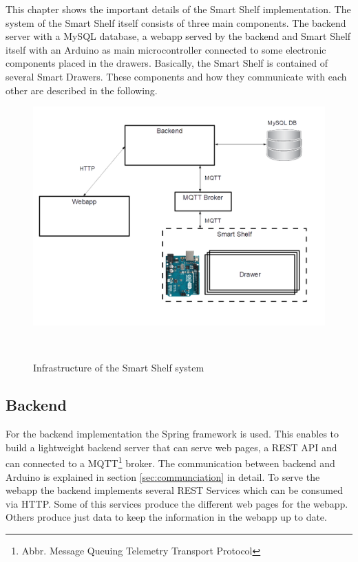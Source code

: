 This chapter shows the important details of the Smart Shelf implementation. 
The system of the Smart Shelf itself consists of three main components. 
The backend server with a MySQL database, a webapp served by the backend and Smart Shelf itself with an Arduino as main microcontroller connected to some electronic components placed in the drawers. 
Basically, the Smart Shelf is contained of several Smart Drawers. 
These components and how they communicate with each other are described in the following. 
%
\begin{figure}
	\centering
	\includegraphics[width=1.3\columnwidth]{figures/infrastructure-smartshelf-white.png}
	\caption{Infrastructure of the Smart Shelf system}~\label{fig:infrastructure}
\end{figure}
%

\subsection{Backend}
For the backend implementation the Spring framework is used. 
This enables to build a lightweight backend server that can serve web pages, a REST API and can connected to a MQTT\footnote{Abbr. Message Queuing Telemetry Transport Protocol} broker. 
The communication between backend and Arduino is explained in section \ref{sec:communciation} in detail. 
To serve the webapp the backend implements several REST Services which can be consumed via HTTP. 
Some of this services produce the different web pages for the webapp. 
Others produce just data to keep the information in the webapp up to date. 

